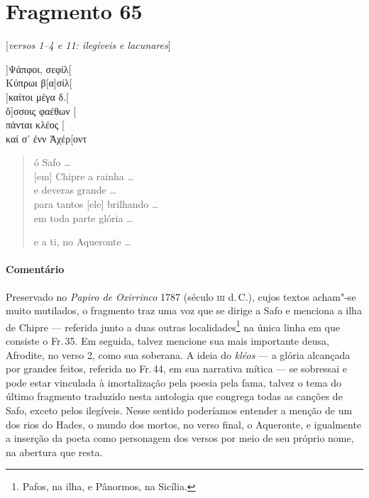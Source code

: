 \section{Fragmento 65}

\begin{gkverse}

\textnormal{[\emph{versos 1--4 e 11: ilegíveis e lacunares}]}

]Ψάπφοι, σεφίλ[\\
Κύπρωι β[α]σίλ[\\
]καίτοι μέγα δ.[\\
ὄ]σσοις φαέθων [\\
πάνται κλέος [\\
καί σ’ ἐνν Ἀχέρ[οντ 
\end{gkverse}

\begin{verse}
ó Safo \ldots{}\\
{[}em{]} Chipre a rainha \ldots{}\\
e deveras grande \ldots{}\\
para tantos [ele] brilhando \ldots{}\\
em toda parte glória \ldots{}\\

\medskip

e a ti, no Aqueronte \ldots{}\\
\end{verse}

\medskip

\paragraph{Comentário} Preservado no \emph{Papiro de Oxirrinco} 1787  (século \textsc{iii} d.\,C.), cujos textos acham"-se muito mutilados, o fragmento traz uma voz que se dirige a Safo e menciona a ilha de Chipre --- referida junto a duas outras localidades\footnote{Pafos, na ilha, e Pânormos, na Sicília.} na única linha em que consiste o Fr.\,35. Em seguida, talvez mencione sua mais importante deusa, Afrodite, no verso 2, como sua soberana. A ideia do \emph{kléos} --- a glória alcançada por grandes feitos, referida no Fr.\,44, em sua narrativa mítica --- se sobressai e pode estar vinculada à imortalização pela poesia pela fama, talvez o tema do último fragmento traduzido nesta antologia que congrega todas as canções de Safo, exceto pelos ilegíveis. Nesse sentido poderíamos entender a menção de um dos rios do Hades, o mundo dos mortos, no verso final, o Aqueronte, e igualmente a inserção da poeta como personagem dos versos por meio de seu próprio nome, na abertura que resta.



